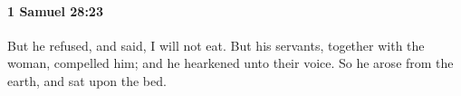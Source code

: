
		\paragraph{1 Samuel 28:23} %
			\label{1SAMUEL-28-23}

			But he refused, and said, I will not eat. But his servants, together with the woman, compelled him; and he hearkened unto their voice. So he arose from the earth, and sat upon the bed.


